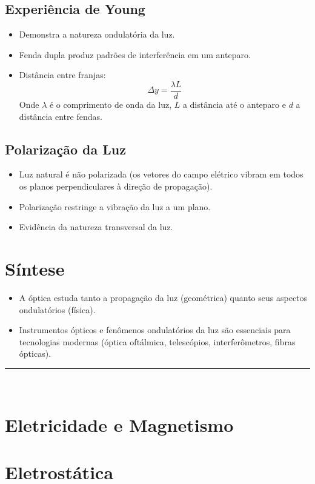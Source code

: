 \documentclass[a4paper,12pt]{article}
\begin{document}
\begin{multicols}{2}
\subsection{Experiência de Young}
\begin{itemize}
    \item Demonstra a natureza ondulatória da luz.
    \item Fenda dupla produz padrões de interferência em um anteparo.
    \item Distância entre franjas:
    \[
        \Delta y = \frac{\lambda L}{d}
    \]
    Onde $\lambda$ é o comprimento de onda da luz, $L$ a distância até o anteparo e $d$ a distância entre fendas.
\end{itemize}

\subsection{Polarização da Luz}
\begin{itemize}
    \item Luz natural é não polarizada (os vetores do campo elétrico vibram em todos os planos perpendiculares à direção de propagação).
    \item Polarização restringe a vibração da luz a um plano.
    \item Evidência da natureza transversal da luz.
\end{itemize}

\section{Síntese}
\begin{itemize}
    \item A óptica estuda tanto a propagação da luz (geométrica) quanto seus aspectos ondulatórios (física).
    \item Instrumentos ópticos e fenômenos ondulatórios da luz são essenciais para tecnologias modernas (óptica oftálmica, telescópios, interferômetros, fibras ópticas).
\end{itemize}

\noindent\rule{\linewidth}{1pt}\\

\section{Eletricidade e Magnetismo}

\section{Eletrostática}


\end{multicols}
\end{document}

